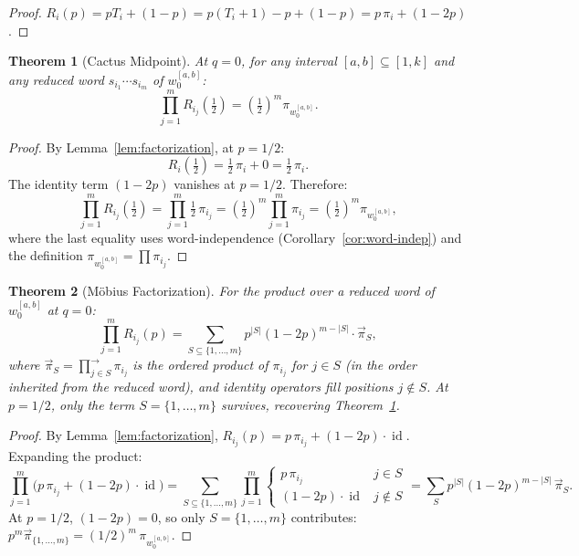 \documentclass[11pt]{article}
\newtheorem{theorem}{Theorem}
\theoremstyle{definition}
\theoremstyle{remark}
\DeclareMathOperator{\id}{id}
\begin{document}
\begin{proof}
$R_i(p) = pT_i + (1-p) = p(T_i + 1) - p + (1-p) = p\,\pi_i + (1-2p)$.
\end{proof}

\begin{theorem}[Cactus Midpoint]\label{thm:cactus-midpoint}
At $q = 0$, for any interval $[a,b] \subseteq [1,k]$ and any reduced word
$s_{i_1}\cdots s_{i_m}$ of $w_0^{[a,b]}$:
\begin{equation}\label{eq:midpoint}
\prod_{j=1}^{m} R_{i_j}\!\left(\tfrac{1}{2}\right) = \left(\tfrac{1}{2}\right)^m \pi_{w_0^{[a,b]}}.
\end{equation}
\end{theorem}

\begin{proof}
By Lemma~\ref{lem:factorization}, at $p = 1/2$:
\[
R_i\!\left(\tfrac{1}{2}\right) = \tfrac{1}{2}\,\pi_i + 0 = \tfrac{1}{2}\,\pi_i.
\]
The identity term $(1-2p)$ vanishes at $p = 1/2$. Therefore:
\[
\prod_{j=1}^{m} R_{i_j}\!\left(\tfrac{1}{2}\right)
= \prod_{j=1}^{m} \tfrac{1}{2}\,\pi_{i_j}
= \left(\tfrac{1}{2}\right)^m \prod_{j=1}^{m} \pi_{i_j}
= \left(\tfrac{1}{2}\right)^m \pi_{w_0^{[a,b]}},
\]
where the last equality uses word-independence
(Corollary~\ref{cor:word-indep}) and the definition
$\pi_{w_0^{[a,b]}} = \prod \pi_{i_j}$.
\end{proof}

\begin{theorem}[M\"obius Factorization]\label{thm:mobius}
For the product over a reduced word of $w_0^{[a,b]}$ at $q = 0$:
\begin{equation}\label{eq:mobius}
\prod_{j=1}^m R_{i_j}(p) = \sum_{S \subseteq \{1,\ldots,m\}} p^{|S|}(1-2p)^{m-|S|} \cdot \vec{\pi}_S,
\end{equation}
where $\vec{\pi}_S = \prod_{j \in S}^{\to} \pi_{i_j}$ is the ordered
product of $\pi_{i_j}$ for $j \in S$ (in the order inherited from the
reduced word), and identity operators fill positions $j \notin S$.
At $p = 1/2$, only the term $S = \{1,\ldots,m\}$ survives, recovering
Theorem~\ref{thm:cactus-midpoint}.
\end{theorem}

\begin{proof}
By Lemma~\ref{lem:factorization}, $R_{i_j}(p) = p\,\pi_{i_j} + (1-2p)\cdot\id$.
Expanding the product:
\[
\prod_{j=1}^m \bigl(p\,\pi_{i_j} + (1-2p)\cdot\id\bigr)
= \sum_{S \subseteq \{1,\ldots,m\}} \prod_{j=1}^m
\begin{cases} p\,\pi_{i_j} & j \in S \\ (1-2p)\cdot\id & j \notin S \end{cases}
= \sum_S p^{|S|}(1-2p)^{m-|S|}\,\vec{\pi}_S.
\]
At $p = 1/2$, $(1-2p) = 0$, so only $S = \{1,\ldots,m\}$ contributes:
$p^m \vec{\pi}_{\{1,\ldots,m\}} = (1/2)^m\,\pi_{w_0^{[a,b]}}$.
\end{proof}
\end{document}
